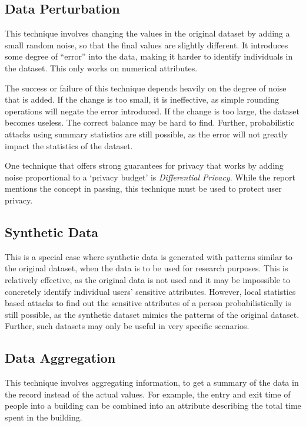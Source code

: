 \documentclass[11pt, a4paper]{article}
\begin{document}
\subsection{Data Perturbation}

This technique involves changing the values in the original dataset by adding a small random noise, so that the final values are slightly different. It introduces some degree of ``error'' into the data, making it harder to identify individuals in the dataset. This only works on numerical attributes.

The success or failure of this technique depends heavily on the degree of noise that is added. If the change is too small, it is ineffective, as simple rounding operations will negate the error introduced. If the change is too large, the dataset becomes useless. The correct balance may be hard to find. Further, probabilistic attacks using summary statistics are still possible, as the error will not greatly impact the statistics of the dataset.

One technique that offers strong guarantees for privacy that works by adding noise proportional to a `privacy budget' is \textit{Differential Privacy}\cite{DifferentialPrivacy}. While the report mentions the concept in passing, this technique must be used to protect user privacy.

\subsection{Synthetic Data}

This is a special case where synthetic data is generated with patterns similar to the original dataset, when the data is to be used for research purposes. This is relatively effective, as the original data is not used and it may be impossible to concretely identify individual users' sensitive attributes. However, local statistics based attacks\cite{surveyattacks} to find out the sensitive attributes of a person probabilistically is still possible, as the synthetic dataset mimics the patterns of the original dataset. Further, such datasets may only be useful in very specific scenarios.

\subsection{Data Aggregation}

This technique involves aggregating information, to get a summary of the data in the record instead of the actual values. For example, the entry and exit time of people into a building can be combined into an attribute describing the total time spent in the building.
\end{document}
